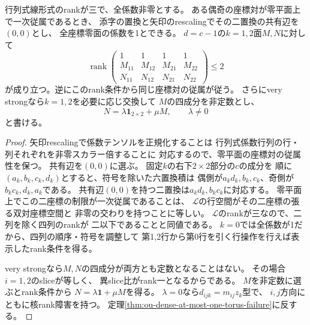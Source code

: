 \begin{proposition}[座標直線が従属する係数テンソルの正規形]
\label{prop:ou-dense-dependent-coordinate-normal-form}
行列式線形式のrankが三で、全係数非零とする。
ある偶奇の座標対が零平面上で一次従属であるとき、
添字の置換と矢印のrescalingでその二置換の共有辺を$(0,0)$とし、
全座標零面の係数を1とできる。
$d=c-1$の$k=1,2$面$M,N$に対して
\[
 \operatorname{rank}
 \begin{pmatrix}
  1&1&1&1\\
  M_{11}&M_{12}&M_{21}&M_{22}\\
  N_{11}&N_{12}&N_{21}&N_{22}
 \end{pmatrix}\leq2
\]
が成り立つ。逆にこのrank条件から同じ座標対の従属が従う。
さらにvery strongなら$k=1,2$を必要に応じ交換して
$M$の四成分を非定数とし、
\[
 N=\lambda\mathbf1_{2\times2}+\mu M,\qquad\lambda\ne0
\]
と書ける。
\end{proposition}
\begin{proof}
矢印rescalingで係数テンソルを正規化することは
行列式係数行列の行・列それぞれを非零スカラー倍することに
対応するので、零平面の座標対の従属性を保つ。
共有辺を$(0,0)$に選ぶ。
固定$k$の右下$2\times2$部分の$c$の成分を
順に$(a_k,b_k,c_k,d_k)$とすると、符号を除いた六置換積は
偶側が$a_kd_k,b_k,c_k$、奇側が$b_kc_k,d_k,a_k$である。
共有辺$(0,0)$を持つ二置換は$a_kd_k,b_kc_k$に対応する。
零平面上でこの二座標の制限が一次従属であることは、
$\mathcal L$の行空間がその二座標の張る双対座標空間と
非零の交わりを持つことに等しい。
$\mathcal L$のrankが三なので、二列を除く四列のrankが
二以下であることと同値である。
$k=0$では全係数が1だから、四列の順序・符号を調整して
第1,2行から第0行を引く行操作を行えば表示したrank条件を得る。

very strongなら$M,N$の四成分が両方とも定数となることはない。
その場合$i=1,2$のsliceが等しく、
異slice比がrank一となるからである。
$M$を非定数に選ぶとrank条件から
$N=\lambda\mathbf1+\mu M$を得る。
$\lambda=0$なら$d_{ijk}=m_{ij}z_k$型で、
$i,j$方向にともに核rank障害を持つ。
定理\ref{thm:ou-dense-at-most-one-torus-failure}に反する。
\end{proof}

